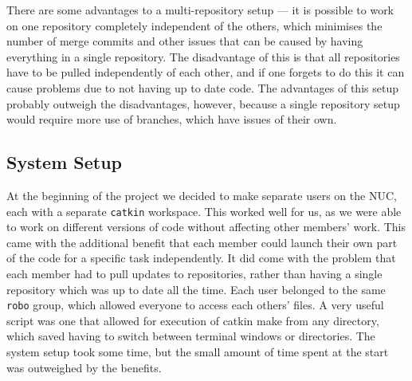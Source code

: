 \documentclass[10pt,a4paper]{article}
\begin{document}
There are some advantages to a multi-repository setup --- it is possible to work
on one repository completely independent of the others, which minimises the
number of merge commits and other issues that can be caused by having everything
in a single repository. The disadvantage of this is that all repositories have
to be pulled independently of each other, and if one forgets to do this it can
cause problems due to not having up to date code. The advantages of this setup
probably outweigh the disadvantages, however, because a single repository setup
would require more use of branches, which have issues of their own.

\subsection{System Setup}
At the beginning of the project we decided to make separate users on the NUC,
each with a separate \texttt{catkin} workspace. This worked well for us, as we
were able to work on different versions of code without affecting other members'
work. This came with the additional benefit that each member could launch their
own part of the code for a specific task independently. It did come with the
problem that each member had to pull updates to repositories, rather than having
a single repository which was up to date all the time. Each user belonged to the
same \texttt{robo} group, which allowed everyone to access each others' files. A
very useful script was one that allowed for execution of catkin make from any
directory, which saved having to switch between terminal windows or directories.
The system setup took some time, but the small amount of time spent at
the start was outweighed by the benefits.
\end{document}
